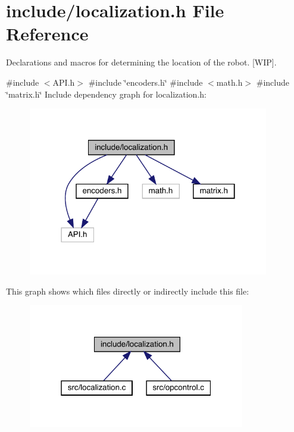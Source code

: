 \section{include/localization.h File Reference}
\label{localization_8h}


Declarations and macros for determining the location of the robot. [W\+IP].  


{\ttfamily \#include $<$A\+P\+I.\+h$>$}\newline
{\ttfamily \#include \char`\"{}encoders.\+h\char`\"{}}\newline
{\ttfamily \#include $<$math.\+h$>$}\newline
{\ttfamily \#include \char`\"{}matrix.\+h\char`\"{}}\newline
Include dependency graph for localization.\+h\+:\nopagebreak
\begin{figure}[H]
\begin{center}
\leavevmode
\includegraphics[width=298pt]{localization_8h__incl}
\end{center}
\end{figure}
This graph shows which files directly or indirectly include this file\+:\nopagebreak
\begin{figure}[H]
\begin{center}
\leavevmode
\includegraphics[width=268pt]{localization_8h__dep__incl}
\end{center}
\end{figure}
